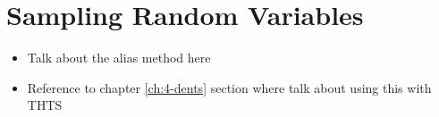 \section{Sampling Random Variables}
\label{sec:2-5-sampling}

    \begin{itemize}
        \item Talk about the alias method here
        \item Reference to chapter \ref{ch:4-dents} section where talk about using this with THTS
    \end{itemize}

